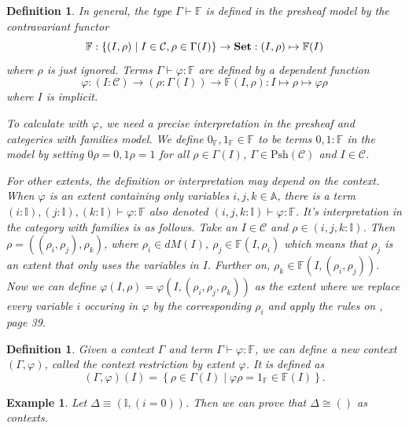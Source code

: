 \documentclass[11pt,a4paper,twoside,xetex,draft]{book}
\newcommand{\keyword}[1]{\emph{#1}\index{#1}}
\newtheorem{definition}[theorem]{Definition}
\newtheorem{example}[theorem]{Example}
\newcommand{\Psh}[1]{\text{Psh}\left(#1\right)}
\begin{document}
\begin{definition}
In general, the type $\Gamma \vdash \mathbb{F}$ is defined in the presheaf model by the contravariant functor $$\mathbb{F} : \left\{ (I, \rho) \mid  I \in \mathcal{C},  \rho \in \Gamma (I) \right\} \rightarrow \text{\textbf{Set}}: (I, \rho) \mapsto \mathbb{F}(I)$$ where $\rho$ is just ignored. Terms $\Gamma \vdash \varphi : \mathbb{F}$ are defined by a dependent function $$\varphi : (I : \mathcal{C}) \rightarrow (\rho : \Gamma (I)) \rightarrow  \mathbb{F}(I,\rho): I \mapsto \rho \mapsto \varphi \rho $$ where $I$ is implicit.

To calculate with $\varphi$, we need a precise interpretation in the presheaf and categeries with families model. We define $ 0_{\mathbb{F}}, 1_{\mathbb{F}} \in \mathbb{F}$ to be terms $0,1 : \mathbb{F}$ in the model by setting $0 \rho = 0, 1 \rho = 1$ for all $\rho \in \Gamma (I)$, $\Gamma \in \Psh{\mathcal{C}}$ and $I \in \mathcal{C}$.  

For other extents, the definition or interpretation may depend on the context. When $\varphi$ is an extent containing only variables $i,j,k \in \mathbb{A}$, there is a term $(i: \mathbb{I}), (j: \mathbb{I}), (k: \mathbb{I}) \vdash \varphi : \mathbb{F}$ also denoted $(i,j,k: \mathbb{I}) \vdash \varphi : \mathbb{F}$. It's interpretation in the category with families is as follows. Take an $I \in \mathcal{C}$ and  $\rho \in (i,j,k: \mathbb{I})$. Then $\rho = ((\rho_i, \rho_j), \rho_k)$, where $\rho_i \in dM(I)$, $\rho_j \in \mathbb{F}(I,\rho_i)$ which means that $\rho_j$ is an extent that only uses the variables in $I$. Further on, $\rho_k \in \mathbb{F}(I, (\rho_i, \rho_j))$. Now we can define $\varphi(I,\rho)=\varphi(I,(\rho_i,\rho_j,\rho_k))$ as the extent where we replace every variable $i$ occuring in $\varphi$ by the corresponding $\rho_i$ and apply the rules on \cite{Orton2019}, page 39.
\end{definition}



\begin{definition}\label{contextrestriction}
Given a context $\Gamma$ and term $\Gamma \vdash \varphi : \mathbb{F}$, we can define a new context $(\Gamma , \varphi)$, called the \keyword{context restriction by extent $\varphi$}. It is defined as  $$(\Gamma , \varphi)(I) = \left\{ \rho \in \Gamma (I) \mid \varphi \rho = 1_{\mathbb{F}} \in \mathbb{F}(I) \right \} .$$
\end{definition}
 
\begin{example}
Let $\Delta \equiv (\mathbb{I}, (i=0))$. Then we can prove that $\Delta \cong ()$ as contexts.
\end{example} 
\end{document}
